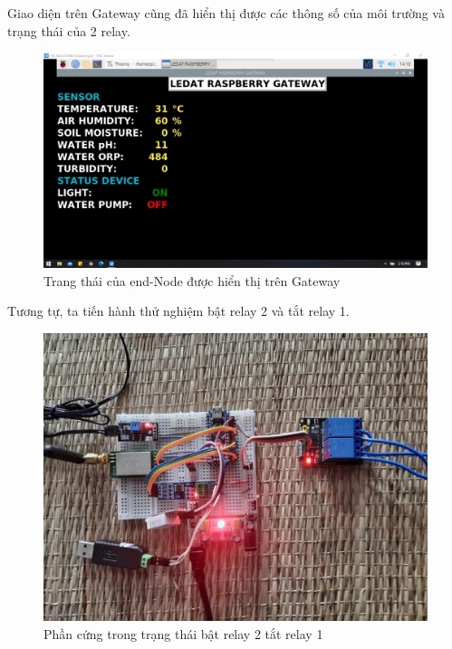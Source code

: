 \indent Giao diện trên Gateway cũng đã hiển thị được các thông số của môi trường và trạng thái của 2 relay.
\begin{figure}[H]
	\centering
	\includegraphics[scale=0.3]{Chapter 4/image chapter 4/Relay1ON-Relay2OFF.png}
	\caption[Trang thái của end-Node được hiển thị trên Gateway]{Trang thái của end-Node được hiển thị trên Gateway}
	\label{hinh47}
\end{figure}
\indent Tương tự, ta tiến hành thử nghiệm bật relay 2 và tắt relay 1.
\begin{figure}[H]
	\centering
	\includegraphics[scale=0.2]{Chapter 4/image chapter 4/R2ONR1OFF.jpg}
	\caption[Phần cứng trong trạng thái bật relay 2 tắt relay 1]{Phần cứng trong trạng thái bật relay 2 tắt relay 1}
	\label{hinh48}
\end{figure}
